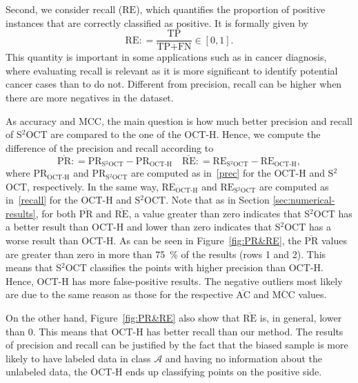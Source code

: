 \documentclass[a4paper,american,reqno]{amsart}
\newcommand{\define}{\mathrel{{\mathop:}{=}}}
\newcommand{\AC}{\text{AC}}
\newcommand{\TP}{\text{TP}}
\newcommand{\FN}{\text{FN}}
\newcommand{\PR}{\text{PR}}
\newcommand{\RE}{\text{RE}}
\newcommand{\OCTH}{\text{OCT-H}}
\newcommand{\MCC}{\text{MCC}}
\newcommand{\SOCT}{\text{S$^2$OCT}}
\begin{document}
Second, we consider recall ($\RE$), which quantifies the proportion of
positive instances that are correctly classified as positive.
It is formally given by
\begin{equation}
  \label{recall}
  \RE \define \frac{\TP}{\TP+\FN} \in [0,1].
\end{equation}
This quantity is important in some applications such as in cancer
diagnosis, where evaluating recall is relevant as it is more
significant to identify potential cancer cases than to do
not. Different from precision, recall can be higher when there are
more negatives in the dataset.

As accuracy and $\MCC$, the main question is how much better
precision and recall of S$^2$OCT are compared to the one of the
OCT-H.
Hence, we compute the difference of the precision and recall according
to
\begin{equation}
  \label{comparOCTH2}
  \overline{\PR} \define \PR_{\SOCT}-\PR_{\OCTH}
  \quad
  \overline{\RE} \define \RE_{\SOCT}-\RE_{\OCTH},
\end{equation}
where $\PR_{\OCTH}$ and $\PR_{\SOCT}$ are computed as in~\eqref{prec}
for the OCT-H and S$^2$OCT, respectively. In the same way,
$\RE_{\OCTH}$ and $\RE_{\SOCT}$ are computed as in~\eqref{recall} for
the OCT-H and S$^2$OCT.
Note that as in Section \ref{sec:numerical-results}, for both
$\overline{\PR}$ and $\overline{\RE}$, a value greater than zero
indicates that S$^2$OCT has a better result than OCT-H and lower than
zero indicates that   S$^2$OCT has a worse result than OCT-H.
As can be seen in Figure~\ref{fig:PR&RE}, the $\overline{\PR}$
values  are greater than zero in more than  \SI{75}{\percent} of the
results (rows 1 and 2).  This means that  S$^2$OCT classifies the
points  with higher precision than OCT-H. Hence, OCT-H has more
false-positive results. The negative outliers most likely are due to
the same reason as  those for the respective $\overline{\AC}$ and
$\overline{\MCC}$ values.

On the other hand, Figure~\ref{fig:PR&RE} also show that
$\overline{\RE}$ is, in general, lower than $0$. This means that OCT-H
has better recall than our method. The results of precision and recall can
be justified by the fact that the biased sample is more likely to have
labeled data in class $\mathcal{A}$ and having no information about
the unlabeled data, the OCT-H ends up classifying points on the
positive side.
\end{document}
